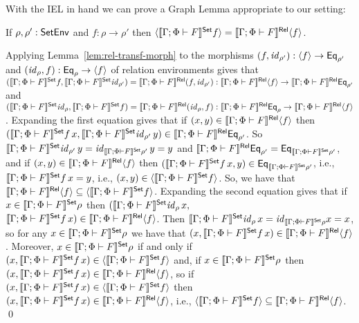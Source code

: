 \documentclass{lmcs}
\theoremstyle{plain}\newtheorem{satz}[thm]{Satz}
\renewcommand{\id}{\mathit{id}}
\begin{document}
With the IEL in hand we can prove a Graph Lemma appropriate to our
setting:
\begin{lem}\label{lem:graph}
If $\rho, \rho' : \mathsf{SetEnv}$ and $f : \rho \to \rho'$ then
$\langle {\llbracket{\Gamma; \Phi \vdash F}\rrbracket^{\mathsf{Set}} f} \rangle = \llbracket{\Gamma; \Phi
  \vdash F}\rrbracket^{\mathsf{Rel}}\langle {f} \rangle$.
\end{lem}
\proof
Applying Lemma~\ref{lem:rel-transf-morph} to the morphisms $(f,
\id_{\rho'}) : \graph{f} \to \Eq_{\rho'}$ and $(\id_{\rho}, f) :
\Eq_{\rho} \to \graph{f}$ of relation environments gives that
$(\setsem{\Gamma; \Phi \vdash F}f, \setsem{\Gamma; \Phi \vdash
  F}\id_{\rho'}) = \relsem{\Gamma; \Phi \vdash F} (f, \id_{\rho'}) :
\relsem{\Gamma; \Phi \vdash F}\graph{f} \to \relsem{\Gamma; \Phi
  \vdash F}\Eq_{\rho'}$ and $(\setsem{\Gamma; \Phi \vdash
  F}\id_{\rho}, \setsem{\Gamma; \Phi \vdash F}f) = \relsem{\Gamma;
  \Phi \vdash F} (\id_{\rho}, f) : \relsem{\Gamma; \Phi \vdash
  F}\Eq_{\rho} \to \relsem{\Gamma; \Phi \vdash F}\graph{f}$.
Expanding the first equation gives that if $(x,y) \in \llbracket{\Gamma;
  \Phi \vdash F}\rrbracket^{\mathsf{Rel}}\langle {f} \rangle$ then $(\setsem{\Gamma; \Phi \vdash F} f\,
x, \setsem{\Gamma; \Phi \vdash F}\id_{\rho'}\, y) \in \relsem{\Gamma;
  \Phi \vdash F}\Eq_{\rho'}$. So $\setsem{\Gamma; \Phi \vdash
  F}\id_{\rho'}\, y = \id_{\setsem{\Gamma; \Phi \vdash F}\rho'}\, y =
y$ and $\llbracket{\Gamma; \Phi \vdash F}\rrbracket^{\mathsf{Rel}}\mathsf{Eq}_{\rho'} =
\mathsf{Eq}_{\llbracket{\Gamma; \Phi \vdash F}\rrbracket^{\mathsf{Set}}\rho'}$, and if $(x,y) \in
\llbracket{\Gamma; \Phi \vdash F}\rrbracket^{\mathsf{Rel}}\langle {f} \rangle$ then $(\llbracket{\Gamma; \Phi
  \vdash F}\rrbracket^{\mathsf{Set}} f\, x, y) \in \mathsf{Eq}_{\llbracket{\Gamma; \Phi \vdash F}\rrbracket^{\mathsf{Set}}\rho'}$,
i.e., $\llbracket{\Gamma; \Phi \vdash F}\rrbracket^{\mathsf{Set}} f\, x = y$, i.e., $(x, y) \in
\langle {\llbracket{\Gamma; \Phi \vdash F}\rrbracket^{\mathsf{Set}} f} \rangle$.  So, we have that
$\llbracket{\Gamma; \Phi \vdash F}\rrbracket^{\mathsf{Rel}}\langle {f} \rangle \subseteq
\langle {\llbracket{\Gamma; \Phi \vdash F}\rrbracket^{\mathsf{Set}}f} \rangle$.  Expanding the second
equation gives that if $x \in \llbracket{\Gamma; \Phi \vdash F}\rrbracket^{\mathsf{Set}}\rho$ then
$(\setsem{\Gamma; \Phi \vdash F}\id_{\rho}\, x,$\\
$\llbracket{\Gamma; \Phi
  \vdash F}\rrbracket^{\mathsf{Set}} f\, x) \in \llbracket{\Gamma; \Phi \vdash F}\rrbracket^{\mathsf{Rel}}\langle {f} \rangle$.  Then
$\setsem{\Gamma; \Phi \vdash F}\id_{\rho}\, x = \id_{\setsem{\Gamma;
    \Phi \vdash F}\rho} x = x$, so for any $x \in \llbracket{\Gamma; \Phi
  \vdash F}\rrbracket^{\mathsf{Set}}\rho$ we have that $(x, \llbracket{\Gamma; \Phi \vdash F}\rrbracket^{\mathsf{Set}}f\,
x) \in \llbracket{\Gamma; \Phi \vdash F}\rrbracket^{\mathsf{Rel}}\langle {f} \rangle$.  Moreover, $x \in
\llbracket{\Gamma; \Phi \vdash F}\rrbracket^{\mathsf{Set}}\rho$ if and only if $(x,
\llbracket{\Gamma; \Phi \vdash F}\rrbracket^{\mathsf{Set}} f\, x) \in \langle {\llbracket{\Gamma; \Phi
    \vdash F}\rrbracket^{\mathsf{Set}}f} \rangle$ and, if $x \in \llbracket{\Gamma; \Phi \vdash F}\rrbracket^{\mathsf{Set}}\rho$
then $(x, \llbracket{\Gamma; \Phi \vdash F}\rrbracket^{\mathsf{Set}} f\, x) \in \llbracket{\Gamma;
  \Phi \vdash F}\rrbracket^{\mathsf{Rel}} \langle {f} \rangle$, so if $(x, \llbracket{\Gamma; \Phi \vdash F}\rrbracket^{\mathsf{Set}}
f\, x) \in \langle {\llbracket{\Gamma; \Phi \vdash F}\rrbracket^{\mathsf{Set}}f} \rangle$ then $(x,
\llbracket{\Gamma; \Phi \vdash F}\rrbracket^{\mathsf{Set}} f\, x) \in \llbracket{\Gamma; \Phi \vdash
  F}\rrbracket^{\mathsf{Rel}} \langle {f} \rangle$, i.e., $\langle {\llbracket{\Gamma; \Phi \vdash F}\rrbracket^{\mathsf{Set}}f} \rangle
\subseteq \llbracket{\Gamma; \Phi \vdash F}\rrbracket^{\mathsf{Rel}} \langle {f} \rangle$.
\qed
\end{document}
